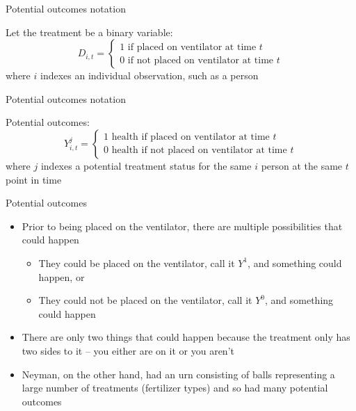 \documentclass{beamer}
\begin{document}
\begin{frame}{Potential outcomes notation}

Let the treatment be a binary variable: $$D_{i,t} =\begin{cases} 1 \text{ if placed on ventilator at time $t$} \\ 0 \text{ if not placed on ventilator at time $t$} \end{cases}$$where $i$ indexes an individual observation, such as a person
\end{frame}

\begin{frame}{Potential outcomes notation}

Potential outcomes: $$Y_{i,t}^j =\begin{cases} 1 \text{ health if placed on ventilator at time $t$} \\ 0 \text{ health if not placed on ventilator at time $t$} \end{cases}$$where $j$ indexes a potential treatment status for the same $i$ person at the same $t$ point in time
\end{frame}


\begin{frame}{Potential outcomes}

  \begin{itemize}
  \item Prior to being placed on the ventilator, there are multiple possibilities that could happen
		\begin{itemize}
		\item They could be placed on the ventilator, call it $Y^1$, and something could happen, or
		\item They could not be placed on the ventilator, call it $Y^0$, and something could happen
		\end{itemize}
\item There are only two things that could happen because the treatment only has two sides to it -- you either are on it or you aren't
\item Neyman, on the other hand, had an urn consisting of balls representing a large number of treatments (fertilizer types) and so had many potential outcomes

\end{itemize}

\end{frame}
\end{document}
